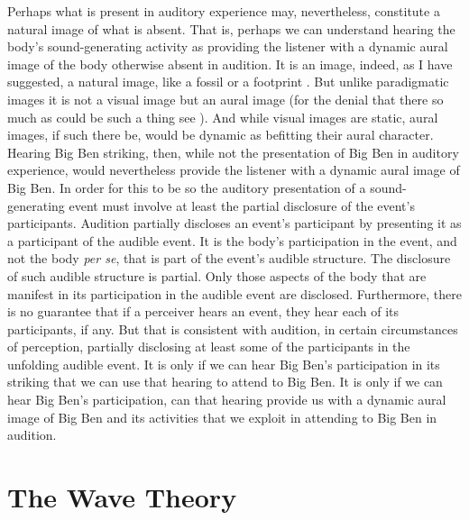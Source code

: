 Perhaps what is present in auditory experience may, nevertheless, constitute a natural image of what is absent. That is, perhaps we can understand hearing the body's sound-generating activity as providing the listener with a dynamic aural image of the body otherwise absent in audition. It is an image, indeed, as I have suggested, a natural image, like a fossil or a footprint \citep[for a recent general discussion of images see][]{Kulvicki:2014hb}. But unlike paradigmatic images it is not a visual image but an aural image (for the denial that there so much as could be such a thing see \citealt{Martin:2012af}). And while visual images are static, aural images, if such there be, would be dynamic as befitting their aural character. Hearing Big Ben striking, then, while not the presentation of Big Ben in auditory experience, would nevertheless provide the listener with a dynamic aural image of Big Ben. In order for this to be so the auditory presentation of a sound-generating event must involve at least the partial disclosure of the event's participants. Audition partially discloses an event's participant by presenting it as a participant of the audible event. It is the body's participation in the event, and not the body \emph{per se}, that is part of the event's audible structure. The disclosure of such audible structure is partial. Only those aspects of the body that are manifest in its participation in the audible event are disclosed. Furthermore, there is no guarantee that if a perceiver hears an event, they hear each of its participants, if any. But that is consistent with audition, in certain circumstances of perception, partially disclosing at least some of the participants in the unfolding audible event. It is only if we can hear Big Ben's participation in its striking that we can use that hearing to attend to Big Ben. It is only if we can hear Big Ben's participation, can that hearing provide us with a dynamic aural image of Big Ben and its activities that we exploit in attending to Big Ben in audition.

\section{The Wave Theory} %
\label{sec:the_wave_theory}

